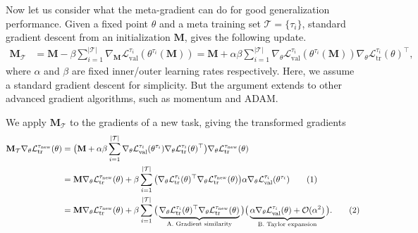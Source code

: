 \documentclass{article}
\newcommand\numberthis{\addtocounter{equation}{1}\tag{\theequation}}
\newcommand*{\B}[1]{\mathbf{#1}}
\newcommand*{\C}[1]{\mathcal{#1}}
\newcommand*{\T}[1]{\textrm{#1}}
\begin{document}
Now let us consider what the meta-gradient can do for good generalization performance. Given a fixed point $\theta$ and a meta training set $\C{T} = \{ \tau_i \}$, standard gradient descent from an initialization $\B{M}$, gives the following update.
\setlength{\belowdisplayskip}{2pt} \setlength{\belowdisplayshortskip}{2pt}
\setlength{\abovedisplayskip}{2pt} \setlength{\abovedisplayshortskip}{2pt}
\begin{align}
\B{M}_\C{T} &= \B{M} - \beta \sum_{i=1}^{|\C{T}|} \nabla_\B{M} \C{L}_\textrm{val}^{\tau_i} (\theta^{\tau_i}(\B{M})) = \B{M} + \alpha \beta \sum_{i=1}^{|\C{T}|} \nabla_\theta \C{L}_\textrm{val}^{\tau_i} (\theta^{\tau_i}(\B{M})) \nabla_\theta \C{L}_\textrm{tr}^{\tau_i}(\theta)^\top,
\end{align}
where $\alpha$ and $\beta$ are fixed inner/outer learning rates respectively. Here, we assume a standard gradient descent for simplicity. But the argument extends to other advanced gradient algorithms, such as momentum and ADAM. 



We apply $\B{M}_\C{T}$ to the gradients of a new task, giving the transformed gradients
\setlength{\belowdisplayskip}{1pt} \setlength{\belowdisplayshortskip}{1pt}
\setlength{\abovedisplayskip}{1pt} \setlength{\abovedisplayshortskip}{1pt}
\begin{align}
\B{M}_\C{T} \nabla_\theta \C{L}_\T{tr}^{\tau_\T{new}}(\theta) &= \big( \B{M} + \alpha \beta \sum_{i=1}^{|\C{T}|} \nabla_\theta \C{L}_\T{val}^{\tau_i} (\theta^{\tau_i}) \nabla_\theta \C{L}_\T{tr}^{\tau_i}(\theta)^\top \big) \nabla_\theta \C{L}_\T{tr}^{\tau_\T{new}}(\theta) \\
\vspace{-2mm}
&= \B{M} \nabla_\theta \C{L}_\T{tr}^{\tau_\T{new}}(\theta) + \beta \sum_{i=1}^{|\C{T}|} \big( \nabla_\theta \C{L}_\T{tr}^{\tau_i}(\theta)^\top  \nabla_\theta \C{L}_\T{tr}^{\tau_\T{new}}(\theta) \big) \alpha \nabla_\theta \C{L}_\T{val}^{\tau_i} (\theta^{\tau_i}) \numberthis \label{eq:mc_new1} \\
\vspace{-2mm}
&= \B{M} \nabla_\theta \C{L}_\T{tr}^{\tau_\T{new}}(\theta) + \beta \sum_{i=1}^{|\C{T}|} \big( \underbrace{ \nabla_\theta \C{L}_\T{tr}^{\tau_i}(\theta)^\top  \nabla_\theta \C{L}_\T{tr}^{\tau_\T{new}}(\theta)}_{\T{A. Gradient similarity}} \big) \big( \underbrace{\alpha \nabla_\theta \C{L}_\T{val}^{\tau_i} (\theta) + \C{O}(\alpha^2)}_{\T{B. Taylor expansion}} \big). \numberthis \label{eq:mc_new2}
\end{align}
\end{document}
